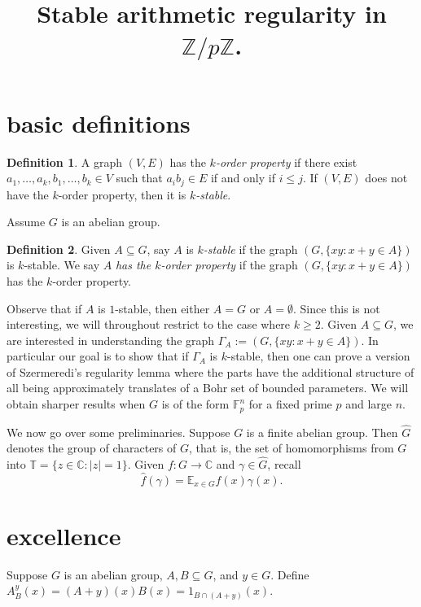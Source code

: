 \documentclass[11pt]{article}
\title{
Stable arithmetic regularity in $\mathbb{Z}/p\mathbb{Z}$.
}
\author{
}
\date{}
\theoremstyle{definition}
\newtheorem{definition}{Definition}
\begin{document}
\maketitle


\section{basic definitions}


\begin{definition}
A graph $(V,E)$ has the \emph{$k$-order property} if there exist $a_1,\ldots, a_k,b_1,\ldots, b_k\in V$ such that $a_ib_j\in E$ if and only if $i\leq j$. If $(V,E)$ does not have the $k$-order property, then it is \emph{$k$-stable}.
\end{definition}

Assume $G$ is an abelian group.  
\begin{definition}
Given $A\subseteq G$, say $A$ is \emph{$k$-stable} if the graph $(G,\{xy: x+y\in A\})$ is $k$-stable.  We say $A$ \emph{has the $k$-order property} if the graph $(G,\{xy: x+y\in A\})$ has the $k$-order property.
\end{definition}

Observe that if $A$ is $1$-stable, then either $A=G$ or $A=\emptyset$.  Since this is not interesting, we will throughout restrict to the case where $k\geq 2$. Given $A\subseteq G$, we are interested in understanding the graph $\Gamma_A:=(G,\{xy: x+y\in A\})$.  In particular our goal is to show that if $\Gamma_A$ is $k$-stable, then one can prove a version of Szermeredi's regularity lemma where the parts have the additional structure of all being approximately translates of a Bohr set of bounded parameters.  We will obtain sharper results when $G$ is of the form $\mathbb{F}_p^n$ for a fixed prime $p$ and large $n$.  

We now go over some preliminaries. Suppose $G$ is a finite abelian group.  Then $\widehat{G}$ denotes the group of characters of $G$, that is, the set of homomorphisms from $G$ into $\mathbb{T}=\{z\in \mathbb{C}: |z|=1\}$.  Given $f:G\rightarrow \mathbb{C}$ and $\gamma\in \widehat{G}$, recall 
$$
\widehat{f}(\gamma)=\mathbb{E}_{x\in G} f(x)\gamma(x).
$$



\section{excellence}
Suppose $G$ is an abelian group, $A, B\subseteq G$, and $y\in G$.  Define $A^{y}_B(x)=(A+y)(x)B(x)=1_{B\cap (A+y)}(x)$. 
\end{document}
